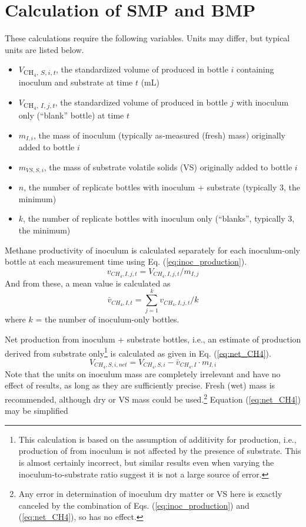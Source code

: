 \documentclass[]{article}
\begin{document}
\section{Calculation of SMP and BMP}
These calculations require the following variables.
Units may differ, but typical units are listed below.
\begin{itemize}
  \item $V$\textsubscript{{CH$_4$, $S, i, t$}}, the standardized volume of  produced in bottle $i$ containing inoculum and substrate at time $t$ (mL)
  \item $V$\textsubscript{{CH$_4$, $I, j, t$}}, the standardized volume of  produced in bottle $j$ with inoculum only (``blank'' bottle) at time $t$
  \item $m_{I, i}$, the mass of inoculum (typically as-measured (fresh) mass) originally added to bottle $i$
  \item $m_{VS, S, i}$, the mass of substrate volatile solids (VS) originally added to bottle $i$
  \item $n$, the number of replicate bottles with inoculum + substrate (typically 3, the minimum)
  \item $k$, the number of replicate bottles with inoculum only (``blanks'', typically 3, the minimum)
\end{itemize}

Methane productivity of inoculum is calculated separately for each inoculum-only bottle at each measurement time using Eq. (\ref{eq:inoc_production}).
\begin{equation}
  \label{eq:inoc_production}
  v_{CH_4, I, j, t} = V_{CH_4, I, j, t} / m_{I, j} 
\end{equation}
And from these, a mean value is calculated as 
\begin{equation}
  \label{eq:inoc_productivity}
  \bar{v}_{CH_4, I, t} = \sum_{j = 1} ^k v_{CH_4, I, j, t} / k
\end{equation}
where $k$ = the number of inoculum-only bottles.

Net  production from inoculum + substrate bottles, i.e., an estimate of  production derived from substrate only\footnote{This calculation is based on the assumption of additivity for  production, i.e., production of  from inoculum is not affected by the presence of substrate. This is almost certainly incorrect, but similar results even when varying the inoculum-to-substrate ratio suggest it is not a large source of error.} is calculated as given in Eq. (\ref{eq:net_CH4}).
\begin{equation}
  \label{eq:net_CH4}
  V_{CH_4, S, i, net} = V_{CH_4, S, i} - \bar{v}_{CH_4, I} \cdot m_{I, i}
\end{equation}
Note that the units on inoculum mass are completely irrelevant and have no effect of results, as long as they are sufficiently precise.
Fresh (wet) mass is recommended, although dry or VS mass could be used.\footnote{Any error in determination of inoculum dry matter or VS here is exactly canceled by the combination of Eqs. (\ref{eq:inoc_production}) and (\ref{eq:net_CH4}), so has no effect.}
Equation (\ref{eq:net_CH4}) may be simplified 
\end{document}
